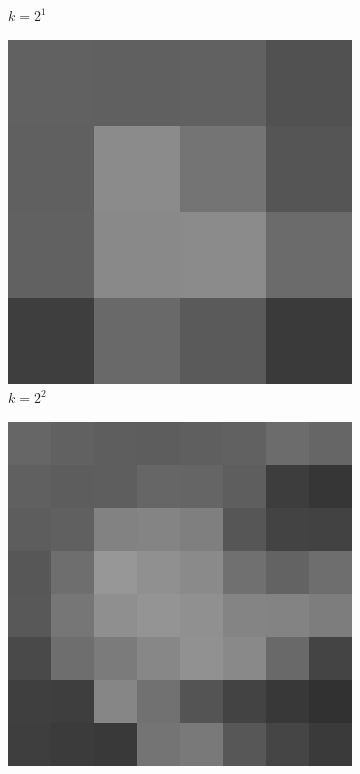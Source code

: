 \begin{figure}[H]
\begin{subfigure}[b]{0.3\textwidth}
        \caption{$k = 2^1$}
    \end{subfigure}
    \hfill
    \begin{subfigure}[b]{0.3\textwidth}
        \centering
        \includegraphics[width=\textwidth]{problem2/low_freq_4.bmp}
        \caption{$k = 2^2$}
    \end{subfigure}
    \begin{subfigure}[b]{0.3\textwidth}
        \centering
        \includegraphics[width=\textwidth]{problem2/low_freq_8.bmp}

\end{subfigure}
\end{figure}
